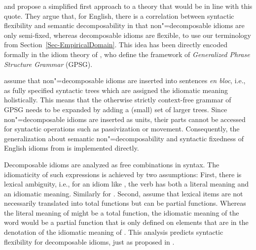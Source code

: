 \documentclass[output=paper
                ,modfonts
                ,nonflat
	        ,collection
	        ,collectionchapter
	        ,collectiontoclongg
 	        ,biblatex
                ,babelshorthands
                ,newtxmath
                ,draftmode
                ,colorlinks, citecolor=brown
]{./langsci/langscibook}
\begin{document}


\citet{WSN84a-u} and \citet{NSW94a} propose a simplified first approach to a theory that would be in line with this quote. They argue that, for English, there is a correlation between syntactic flexibility and semantic decomposability in that non"=decomposable idioms are only semi-fixed, whereas decomposable idioms are flexible, to use our terminology from Section~\ref{Sec-EmpiricalDomain}. 
This idea has been directly encoded formally in the idiom theory of
\citet[Chapter~7]{GKPS85a}, who define the framework of 
\emph{Generalized Phrase Structure Grammar} (GPSG).

\citet{GKPS85a} assume that  non"=decomposable idioms are inserted into sentences \emph{en bloc}, i.e., as fully specified syntactic trees which are assigned the idiomatic meaning holistically. This means that the otherwise strictly context-free grammar of GPSG needs to be expanded by adding a (small) set of larger trees. 
Since non"=decomposable idioms are inserted as units, their parts cannot be accessed for syntactic operations such as passivization or movement. Consequently, the generalization about semantic non"=decomposability and syntactic fixedness of English idioms from \citet{WSN84a-u} is implemented directly.

Decomposable idioms are analyzed as free combinations in syntax. The idiomaticity of such expressions is achieved by two assumptions: First, there is lexical ambiguity, i.e., for an idiom like , the verb  has both a literal meaning and an idiomatic meaning. Similarly for .
Second, \citet{GKPS85a} assume that lexical items are not necessarily translated into total functions but can be partial functions. Whereas the literal meaning of  might be a total function, the idiomatic meaning of the word would be a partial function that is only defined on elements that are in the denotation of the idiomatic meaning of . This analysis predicts syntactic flexibility for decomposable idioms, just as proposed in \citet{WSN84a-u}.




\end{document}
